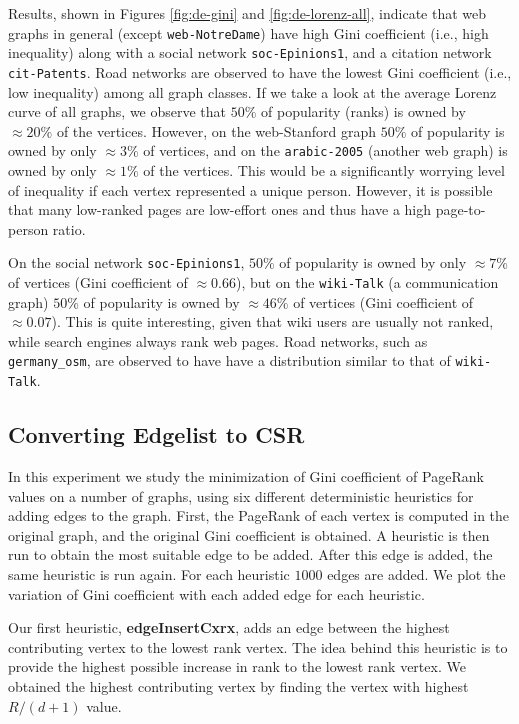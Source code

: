 Results, shown in Figures \ref{fig:de-gini} and \ref{fig:de-lorenz-all}, indicate that web graphs in general (except \verb|web-NotreDame|) have high Gini coefficient (i.e., high inequality) along with a social network \verb|soc-Epinions1|, and a citation network \verb|cit-Patents|. Road networks are observed to have the lowest Gini coefficient (i.e., low inequality) among all graph classes. If we take a look at the average Lorenz curve of all graphs, we observe that $50\%$ of popularity (ranks) is owned by $\approx20\%$ of the vertices. However, on the web-Stanford graph $50\%$ of popularity is owned by only $\approx3\%$ of vertices, and on the \verb|arabic-2005| (another web graph) is owned by only $\approx1\%$ of the vertices. This would be a significantly worrying level of inequality if each vertex represented a unique person. However, it is possible that many low-ranked pages are low-effort ones and thus have a high page-to-person ratio.

On the social network \verb|soc-Epinions1|, $50\%$ of popularity is owned by only $\approx7\%$ of vertices (Gini coefficient of $\approx0.66$), but on the \verb|wiki-Talk| (a communication graph) $50\%$ of popularity is owned by $\approx46\%$ of vertices (Gini coefficient of $\approx0.07$). This is quite interesting, given that wiki users are usually not ranked, while search engines always rank web pages. Road networks, such as \verb|germany_osm|, are observed to have have a distribution similar to that of \verb|wiki-Talk|.




\subsection{Converting Edgelist to CSR}

In this experiment we study the minimization of Gini coefficient of PageRank values on a number of graphs, using six different deterministic heuristics for adding edges to the graph. First, the PageRank of each vertex is computed in the original graph, and the original Gini coefficient is obtained. A heuristic is then run to obtain the most suitable edge to be added. After this edge is added, the same heuristic is run again. For each heuristic $1000$ edges are added. We plot the variation of Gini coefficient with each added edge for each heuristic.

Our first heuristic, \textbf{edgeInsertCxrx}, adds an edge between the highest contributing vertex to the lowest rank vertex. The idea behind this heuristic is to provide the highest possible increase in rank to the lowest rank vertex. We obtained the highest contributing vertex by finding the vertex with highest $R/(d+1)$ value.


